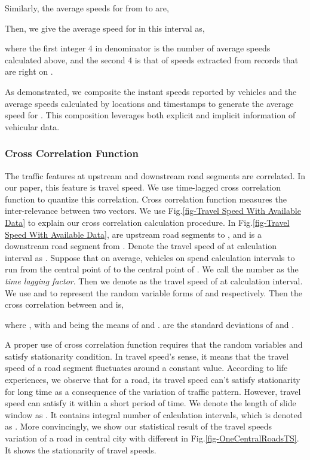 \documentclass[twocolumn,10pt,final,conference]{IEEEtran}
\begin{document}
Similarly, the average speeds for  from  to  are,


Then, we give the average speed for  in this interval  as,

where the first integer 4 in denominator is the number of average speeds calculated above, and the second 4 is that of speeds extracted from records that are right on .

As demonstrated, we composite the instant speeds reported by vehicles and the average speeds calculated by locations and timestamps to generate the average speed for . This composition leverages both explicit and implicit information of vehicular data.


\subsubsection{Cross Correlation Function}\label{section-sub-CCF}
\quad

The traffic features at upstream and downstream road segments are correlated. In our paper, this feature is travel speed. We use time-lagged cross correlation function to quantize this correlation.
Cross correlation function measures the inter-relevance between two vectors. We use Fig.\ref{fig-Travel Speed With Available Data} to explain our cross correlation calculation procedure.
In Fig.\ref{fig-Travel Speed With Available Data},  are upstream road segments to , and  is a downstream road segment from .  Denote the travel speed of  at  calculation interval as . Suppose that on average, vehicles on  spend  calculation intervals to run from the central point of  to the central point of . We call the number  as the \emph{time lagging factor}. Then we denote  as the travel speed of  at  calculation interval.
We use  and  to represent the random variable forms of  and  respectively.
Then the cross correlation between  and  is,

where
,
with  and  being the means of  and .
 are the  standard deviations of  and .

A proper use of cross correlation function requires that the random variables  and  satisfy stationarity condition. In travel speed's sense, it means that the travel speed of a road segment  fluctuates around a constant value.
According to life experiences, we observe that for a road, its travel speed can't satisfy stationarity for long time as a consequence of the variation of traffic pattern. However, travel speed can satisfy it within a short period of time. We denote the length of slide window as . It contains integral number of calculation intervals, which is denoted as . More convincingly, we show our statistical result of the  travel speeds variation of a road in central city with different  in Fig.\ref{fig-OneCentralRoadsTS}. It shows the stationarity of travel speeds.
\end{document}
